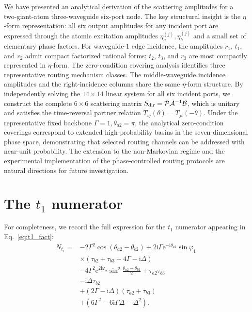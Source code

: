 \documentclass[aps,pra,reprint,superscriptaddress,nofootinbib,longbibliography,floatfix]{revtex4-2}
\newcommand{\ii}{\mathrm{i}}
\newcommand{\ee}{\mathrm{e}}
\newcommand{\Del}{\Delta}
\newcommand{\Gam}{\Gamma}
\newcommand{\ph}{\varphi}
\newcommand{\thaone}{\theta_{a1}}
\newcommand{\thatwo}{\theta_{a2}}
\newcommand{\thbtwo}{\theta_{b2}}
\begin{document}
We have presented an analytical derivation of the scattering amplitudes for a two-giant-atom three-waveguide six-port node.
The key structural insight is the $\eta$-form representation: all six output amplitudes for any incident port are expressed through the atomic excitation amplitudes $\eta_a^{(j)},\eta_b^{(j)}$ and a small set of elementary phase factors.
For waveguide-1 edge incidence, the amplitudes $r_1$, $t_1$, and $r_2$ admit compact factorized rational forms; $t_2$, $t_3$, and $r_3$ are most compactly represented in $\eta$-form.
The zero-condition covering analysis identifies three representative routing mechanism classes.
The middle-waveguide incidence amplitudes and the right-incidence columns share the same $\eta$-form structure.
By independently solving the $14\times14$ linear system for all six incident ports, we construct the complete $6\times6$ scattering matrix $S_{\rm dir}=\mathcal{P}\mathcal{A}^{-1}\mathcal{B}$, which is unitary and satisfies the time-reversal partner relation $T_{ij}(\theta)=T_{ji}(-\theta)$.
Under the representative fixed backbone $\Gamma=1,\theta_{a2}=\pi$, the analytical zero-condition coverings correspond to extended high-probability basins in the seven-dimensional phase space, demonstrating that selected routing channels can be addressed with near-unit probability.
The extension to the non-Markovian regime and the experimental implementation of the phase-controlled routing protocols are natural directions for future investigation.

\appendix

\section{\texorpdfstring{The $t_1$ numerator}{The t1 numerator}}
\label{app:t1}

For completeness, we record the full expression for the $t_1$ numerator appearing in Eq.~\eqref{eq:t1_fact}:
\begin{align}
N_{t_1} =& -2\Gam^2\cos(\thatwo-\thbtwo)
          + 2\ii\Gam\ee^{-\ii\thaone}\sin\ph_1 \nonumber\\
        &\times(\tau_{b2}+\tau_{b3}+4\Gam-\ii\Del)
          \nonumber\\
        & - 4\Gam^2\ee^{2\ii\ph_2}
          \sin^2\frac{\thatwo-\thbtwo}{2}
          + \tau_{a2}\tau_{b3} \nonumber\\
        & - \ii\Del\tau_{b2}
          \nonumber\\
        & + (2\Gam-\ii\Del)(\tau_{a2}+\tau_{b3}) \nonumber\\
        & + (6\Gam^2-6\ii\Gam\Del-\Del^2).
\end{align}
\end{document}
